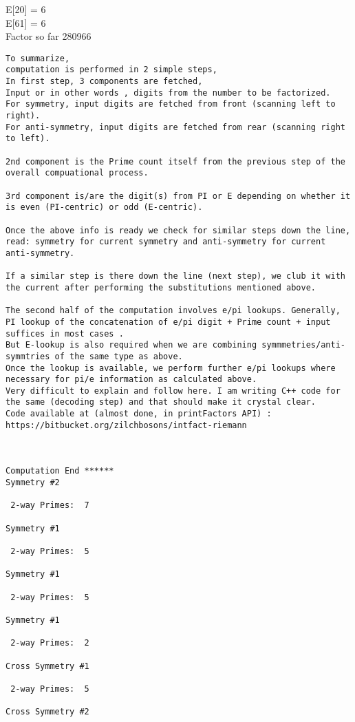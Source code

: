 E[20] = 6 \\
E[61] = 6 \\
Factor so far { 280966 } \\
\begin{verbatim}
To summarize, 
computation is performed in 2 simple steps,
In first step, 3 components are fetched,
Input or in other words , digits from the number to be factorized.
For symmetry, input digits are fetched from front (scanning left to right).
For anti-symmetry, input digits are fetched from rear (scanning right to left).

2nd component is the Prime count itself from the previous step of the overall compuational process.

3rd component is/are the digit(s) from PI or E depending on whether it is even (PI-centric) or odd (E-centric).

Once the above info is ready we check for similar steps down the line, read: symmetry for current symmetry and anti-symmetry for current anti-symmetry.

If a similar step is there down the line (next step), we club it with the current after performing the substitutions mentioned above.

The second half of the computation involves e/pi lookups. Generally, PI lookup of the concatenation of e/pi digit + Prime count + input suffices in most cases .
But E-lookup is also required when we are combining symmmetries/anti-symmtries of the same type as above.
Once the lookup is available, we perform further e/pi lookups where necessary for pi/e information as calculated above.
Very difficult to explain and follow here. I am writing C++ code for the same (decoding step) and that should make it crystal clear.
Code available at (almost done, in printFactors API) : https://bitbucket.org/zilchbosons/intfact-riemann



Computation End ******
Symmetry #2

 2-way Primes: 	7

Symmetry #1

 2-way Primes: 	5

Symmetry #1

 2-way Primes: 	5

Symmetry #1

 2-way Primes: 	2

Cross Symmetry #1

 2-way Primes: 	5

Cross Symmetry #2


\end{verbatim}
